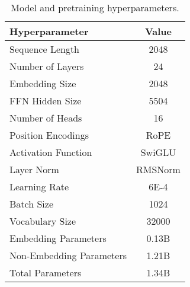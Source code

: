\begin{table}[!t]
\small 
\centering
\setlength{\tabcolsep}{8pt}
\begin{tabular}{l|c}
\toprule
 Hyperparameter &  Value\\
\midrule
Sequence Length &   2048 \\
    Number of Layers &    24 \\
   Embedding Size &    2048 \\
   FFN Hidden Size &   5504 \\
   Number of Heads &   16 \\
   Position Encodings &   RoPE \\
   Activation Function &   SwiGLU\\
   Layer Norm &   RMSNorm \\
   Learning Rate &   6E-4 \\
   Batch Size &   1024 \\
   Vocabulary Size &    32000 \\
 \midrule
   Embedding Parameters &   0.13B \\
   Non-Embedding Parameters &   1.21B\\
   Total Parameters &   1.34B\\
\bottomrule
\end{tabular}
\caption{Model and pretraining hyperparameters.} 
\label{tab:model-arch}
\end{table}